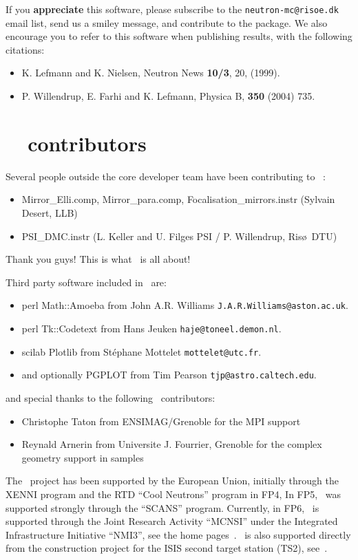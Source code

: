 If you {\bf appreciate} this software, please subscribe to the \verb+neutron-mc@risoe.dk+ email list, send us a smiley message, and contribute to the package. We also encourage you to refer to this software when publishing results, with the following citations:
\begin{itemize}
\item{K. Lefmann and K. Nielsen, Neutron News {\bf 10/3}, 20, (1999).}
\item{P. Willendrup, E. Farhi and K. Lefmann, Physica B, {\bf 350} (2004) 735.}
\end{itemize}


\section*{\MCS\ \version\ contributors}
Several people outside the core developer team have been contributing
to \MCS\ \version:
\begin{itemize}
\item Mirror\_Elli.comp, Mirror\_para.comp,
  Focalisation\_mirrors.instr (Sylvain Desert, LLB)
\item PSI\_DMC.instr (L. Keller and U. Filges PSI / P. Willendrup, Ris\o\ DTU)
\end{itemize}
Thank you 	guys! This is what \MCS\ is all about!

Third party software included in \MCS\ are:
\begin{itemize}
\item perl Math::Amoeba from John A.R. Williams \verb+J.A.R.Williams@aston.ac.uk+.
\item perl Tk::Codetext from Hans Jeuken \verb+haje@toneel.demon.nl+.
\item scilab Plotlib from St\'ephane Mottelet \verb+mottelet@utc.fr+.
\item and optionally PGPLOT from Tim Pearson \verb+tjp@astro.caltech.edu+.
\end{itemize}
and special thanks to the following \MCS\ contributors:
\begin{itemize}
\item Christophe Taton from ENSIMAG/Grenoble for the MPI support
\item Reynald Arnerin from Universite J. Fourrier, Grenoble for the complex geometry support in samples
\end{itemize} 

The \MCS\ project has been supported by the European Union, initially
through the XENNI program and the RTD ``Cool Neutrons'' program in FP4,
In FP5, \MCS\ was supported strongly through the
``SCANS'' program.
Currently, in FP6, \MCS\ is supported through the Joint Research Activity
``MCNSI'' under the Integrated Infrastructure Initiative ``NMI3'', see
the home pages~\cite{mcnsi_webpage,nmi3_webpage}. \MCS\ is also
supported directly from the construction project for the ISIS second
target station (TS2), see~\cite{ts2_webpage}.
